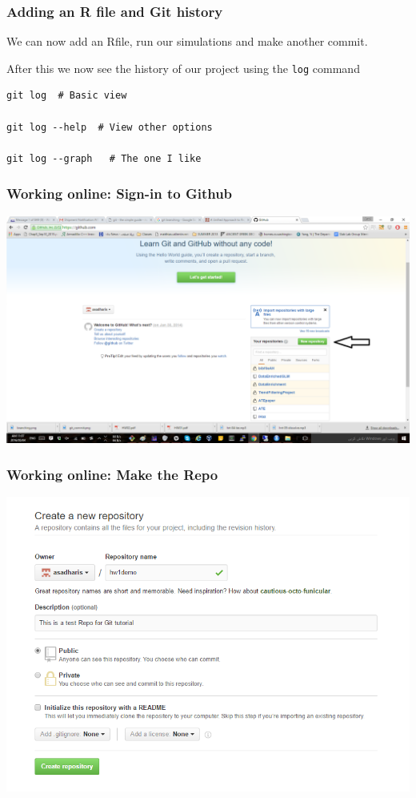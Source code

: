 \documentclass{beamer}
\begin{document}
\begin{frame}[fragile]
\frametitle{Adding an R file and Git history}
We can now add an Rfile, run our simulations and make another commit.


After this we now see the history of our project using the \texttt{log} command

\begin{verbatim}
git log  # Basic view

git log --help  # View other options

git log --graph   # The one I like
\end{verbatim}
\end{frame}

\begin{frame}
\frametitle{Working online: Sign-in to Github}
\includegraphics[scale = 0.3]{signin}
\end{frame}

\begin{frame}
\centering
\frametitle{Working online: Make the Repo}
\includegraphics[scale = 0.4]{makerepo}
\end{frame}
\end{document}
